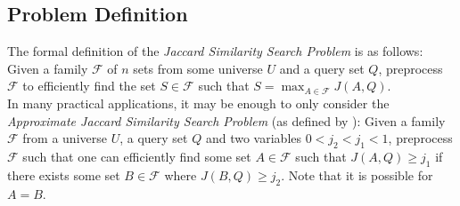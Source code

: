 \subsection{Problem Definition}
The formal definition of the \textit{Jaccard Similarity Search Problem} is as follows:
Given a family $\mathcal{F}$ of $n$ sets from some universe $U$ and a query set $Q$, preprocess $\mathcal{F}$ to efficiently find the set $S\in \mathcal{F}$ such that $S = \max_{A\in \mathcal{F}}J(A,Q)$. \\
In many practical applications, it may be enough to only consider the \textit{Approximate Jaccard Similarity Search Problem} (as defined by \citet{fast-similarity-search}): Given a family $\mathcal{F}$ from a universe $U$, a query set $Q$ and two variables $0 < j_2 < j_1 < 1$, preprocess $\mathcal{F}$ such that one can efficiently find some set $A \in \mathcal{F}$ such that $J(A,Q) \geq j_1$ if there exists some set $B \in \mathcal{F}$ where $J(B,Q) \geq j_2$. Note that it is possible for $A = B$.

